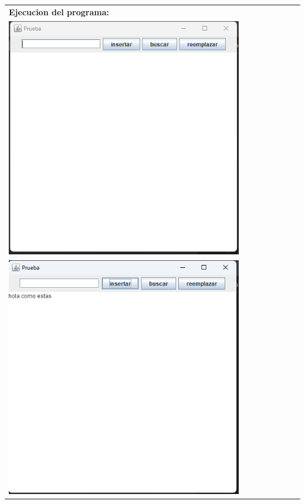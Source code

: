 \documentclass[9pt]{article}
\begin{document}
\begin{longtable}{|p{15cm}|}
		\textbf{Ejecucion del programa:}\\
		\includegraphics[width=0.8\textwidth,keepaspectratio]{img/pantallaInicial.png}\\
		\includegraphics[width=0.8\textwidth,keepaspectratio]{img/insertandoOracion.png}\\

\end{longtable}
\end{document}
